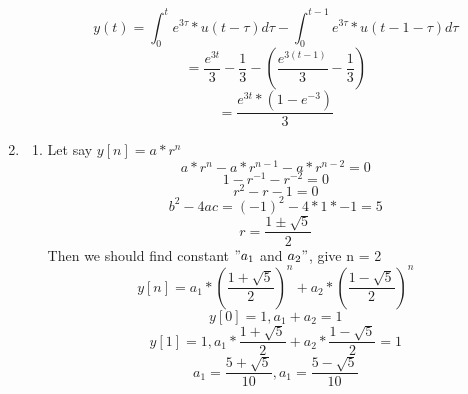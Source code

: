 \documentclass[10pt,a4paper, margin=1in]{article}
\begin{document}
\begin{enumerate}
\begin{enumerate}
\begin{equation*}
    \end{equation*}
    \begin{equation*}
        y(t) = \int_{0}^{t} e^{3\tau}*u(t-\tau)d\tau - \int_{0}^{t-1} e^{3\tau}*u(t-1-\tau)d\tau
    \end{equation*}
    \begin{equation*}
        = \frac{e^{3t}}{3} - \frac{1}{3} - (\frac{e^{3(t-1)}}{3} - \frac{1}{3})
    \end{equation*}
    \begin{equation*}
        = \frac{e^{3t}*(1 - e^{-3})}{3}
    \end{equation*}
    \end{enumerate}

\item %
    \begin{enumerate}   
    \item %
    Let say $y[n] = a*r^n$\\
    \begin{equation*}
        a*r^n - a*r^{n-1} - a*r^{n-2} = 0
    \end{equation*}
    \begin{equation*}
        1 - r^{-1} - r^{-2} = 0
    \end{equation*}
    \begin{equation*}
        r^2 - r - 1 = 0
    \end{equation*}
    \begin{equation*}
        b^2-4ac = (-1)^2 - 4*1*-1 = 5
    \end{equation*}
    \begin{equation*}
        r = \frac{1 \pm \sqrt{5}}{2}
    \end{equation*}
    Then we should find constant $"a_1$ and $a_2"$, give n = 2
    \begin{equation*}
        y[n] = a_1 * (\frac{1 + \sqrt{5}}{2})^n + a_2 * (\frac{1 - \sqrt{5}}{2})^n
    \end{equation*}
    \begin{equation*}
        y[0] = 1,  a_1 + a_2 = 1
    \end{equation*}
    \begin{equation*}
        y[1] = 1, a_1*\frac{1 + \sqrt{5}}{2} + a_2*\frac{1 - \sqrt{5}}{2} = 1
    \end{equation*}
    \begin{equation*}
        a_1 = \frac{5 + \sqrt{5}}{10}, a_1 = \frac{5 - \sqrt{5}}{10}

\end{equation*}
\end{enumerate}
\end{enumerate}
\end{document}

